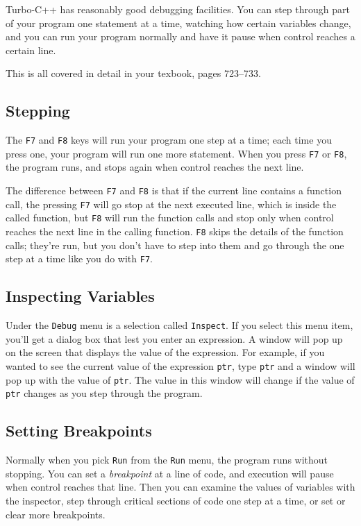 Turbo-C++ has reasonably good debugging facilities.  You can step
through part of your program one statement at a time, watching how
certain variables change, and you can run your program normally and have
it pause when control reaches a certain line.

This is all covered in detail in your texbook, pages 723--733.

\subsection{Stepping}

The {\tt F7} and {\tt F8} keys will run your program one step at a time;
each time you press one, your program will run one more statement.  When
you press {\tt F7} or {\tt F8}, the program runs, and stops again when
control reaches the next line. 

The difference between {\tt F7} and {\tt F8} is that if the current line
contains a function call, the pressing {\tt F7} will go stop at the next
executed line, which is inside the called function, but {\tt F8} will
run the function calls and stop only when control reaches the next line
in the calling function.  {\tt F8} skips the details of the function
calls; they're run, but you don't have to step into them and go through
the one step at a time like you do with {\tt F7}.

\subsection{Inspecting Variables}

Under the {\tt Debug} menu is a selection called {\tt Inspect}.  If you
select this menu item, you'll get a dialog box that lest you enter an
expression.  A window will pop up on the screen that displays the value
of the expression.  For example, if you wanted to see the current value
of the expression {\tt *ptr}, type {\tt *ptr} and a window will pop up
with the value of {\tt *ptr}.  The value in this window will change if
the value of {\tt *ptr} changes as you step through the program.

\subsection{Setting Breakpoints}

Normally when you pick {\tt Run} from the {\tt Run} menu, the program
runs without stopping.  You can set a {\em breakpoint} at a line of
code, and execution will pause when control reaches that line.  Then you
can examine the values of variables with the inspector, step through
critical sections of code one step at a time, or set or clear more
breakpoints.  

